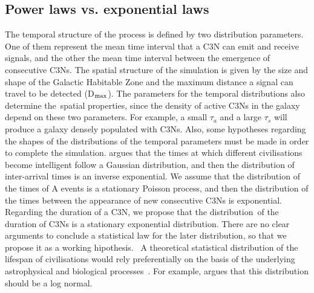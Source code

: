 \documentclass[crop]{CSLB}
\newcommand{\ceti}{C3N}
\newcommand{\cetis}{C3Ns}
\begin{document}
    

\subsection{Power laws vs. exponential laws}\label{SS_PDF_shape}

The temporal structure of the process is defined by two distribution parameters. One of them represent the mean time
interval that a \ceti{} can emit and receive signals, and the other the mean time interval between the emergence of
consecutive \cetis{}. The spatial structure of the simulation is given by the size and shape of the Galactic Habitable
Zone and the maximum distance a signal can travel to be detected
(D$_{\rm max}$). The parameters for the temporal
distributions also determine the spatial properties, since the density of active \cetis{} in the galaxy depend on these
two parameters. For example, a small $\tau_a$ and a large $\tau_s$ will produce a galaxy densely populated with
\cetis{}. Also, some hypotheses regarding the shapes of the distributions of the temporal parameters must be made in
order to complete the simulation. \citet{forgan_spatiotemporal_2011} argues that the times at which different
civilisations become intelligent follow a Gaussian distribution, and then the distribution of inter-arrival times is an
inverse exponential. We assume that the distribution of the times of A events is a stationary Poisson process, and then
the distribution of the times between the appearance of new consecutive \cetis{} is exponential. Regarding the duration
of a \ceti{}, we propose that the distribution of the duration of \cetis{} is a stationary exponential distribution.
There are no clear arguments to conclude a statistical law for the later distribution, so that we propose it as a
working hipothesis.  A theoretical statistical distribution of the lifespan of civilisations would rely preferentially
on the basis of the underlying astrophysical and biological processes \citep{balbi_impact_2018}. For example,
\citet{maccone_lognormals_2014} argues that this distribution should be a log normal. 
\end{document}
